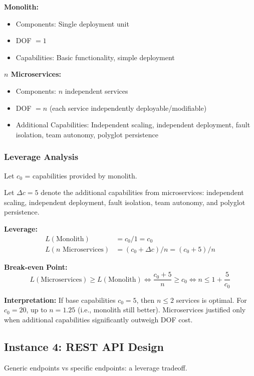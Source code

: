 \textbf{Monolith:}
\begin{itemize}
\item Components: Single deployment unit
\item DOF $= 1$
\item Capabilities: Basic functionality, simple deployment
\end{itemize}

\textbf{$n$ Microservices:}
\begin{itemize}
\item Components: $n$ independent services
\item DOF $= n$ (each service independently deployable/modifiable)
\item Additional Capabilities: Independent scaling, independent deployment, fault isolation, team autonomy, polyglot persistence \cite{fowler2014microservices}
\end{itemize}

\subsubsection{Leverage Analysis}

Let $c_0$ = capabilities provided by monolith.

Let $\Delta c = 5$ denote the additional capabilities from microservices:
independent scaling, independent deployment, fault isolation, team autonomy,
and polyglot persistence.

\textbf{Leverage:}
\begin{align*}
L(\text{Monolith}) &= c_0 / 1 = c_0 \\
L(n \text{ Microservices}) &= (c_0 + \Delta c) / n = (c_0 + 5) / n
\end{align*}

\textbf{Break-even Point:}
\[
L(\text{Microservices}) \geq L(\text{Monolith}) \iff \frac{c_0 + 5}{n} \geq c_0 \iff n \leq 1 + \frac{5}{c_0}
\]

\textbf{Interpretation:} If base capabilities $c_0 = 5$, then $n \leq 2$ services is optimal. For $c_0 = 20$, up to $n = 1.25$ (i.e., monolith still better). Microservices justified only when additional capabilities significantly outweigh DOF cost.

\subsection{Instance 4: REST API Design}

Generic endpoints vs specific endpoints: a leverage tradeoff.


